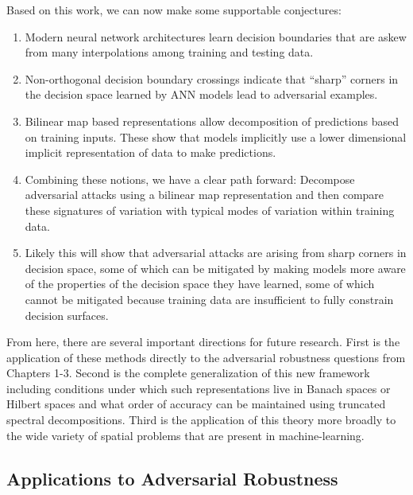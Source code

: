 Based on this work, we can now make some supportable conjectures:

\begin{enumerate}
  \item Modern neural network architectures learn decision boundaries
    that are askew from many interpolations among training and testing
    data.
  \item Non-orthogonal decision boundary crossings indicate that
    ``sharp'' corners in the decision space learned by ANN models lead
    to adversarial examples.
  \item Bilinear map based representations allow decomposition of
    predictions based on training inputs. These show that models
    implicitly use a lower dimensional implicit representation of data
    to make predictions.
  \item Combining these notions, we have a clear path forward:
    Decompose adversarial attacks using a bilinear map
    representation and then compare these signatures of variation with
    typical modes of variation within training data.
  \item Likely this will show that adversarial attacks are arising
    from sharp corners in decision space, some of which can be
    mitigated by making models more aware of the properties of the
    decision space they have learned, some of which cannot be
    mitigated because training data are insufficient to fully
    constrain decision surfaces. 
\end{enumerate}

From here, there are several important directions for
future research. First is the application of these methods directly to
the adversarial robustness questions from Chapters 1-3. Second is the
complete generalization of this new framework including conditions
under which such representations live in Banach spaces or Hilbert
spaces and what order of accuracy can be maintained using truncated
spectral decompositions. Third is the application of this theory more
broadly to the wide variety of spatial problems that are present in
machine-learning. 

\subsection{Applications to Adversarial Robustness}

